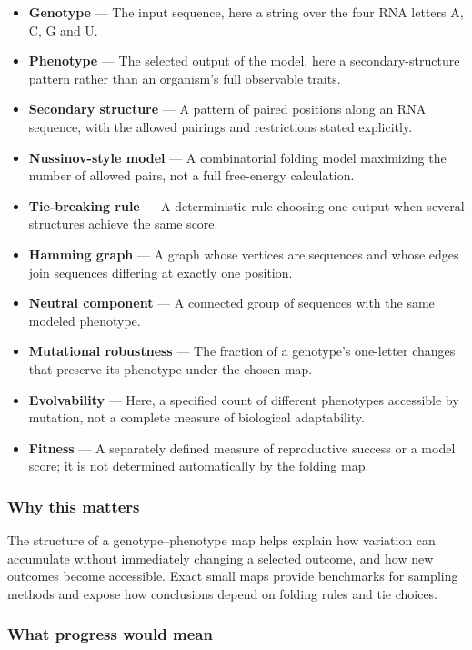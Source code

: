 \documentclass[
  11pt,
]{article}
\begin{document}
\begin{itemize}
\item
  \textbf{Genotype} --- The input sequence, here a string over the four
  RNA letters A, C, G and U.
\item
  \textbf{Phenotype} --- The selected output of the model, here a
  secondary-structure pattern rather than an organism's full observable
  traits.
\item
  \textbf{Secondary structure} --- A pattern of paired positions along
  an RNA sequence, with the allowed pairings and restrictions stated
  explicitly.
\item
  \textbf{Nussinov-style model} --- A combinatorial folding model
  maximizing the number of allowed pairs, not a full free-energy
  calculation.
\item
  \textbf{Tie-breaking rule} --- A deterministic rule choosing one
  output when several structures achieve the same score.
\item
  \textbf{Hamming graph} --- A graph whose vertices are sequences and
  whose edges join sequences differing at exactly one position.
\item
  \textbf{Neutral component} --- A connected group of sequences with the
  same modeled phenotype.
\item
  \textbf{Mutational robustness} --- The fraction of a genotype's
  one-letter changes that preserve its phenotype under the chosen map.
\item
  \textbf{Evolvability} --- Here, a specified count of different
  phenotypes accessible by mutation, not a complete measure of
  biological adaptability.
\item
  \textbf{Fitness} --- A separately defined measure of reproductive
  success or a model score; it is not determined automatically by the
  folding map.
\end{itemize}

\subsubsection{Why this matters}

The structure of a genotype--phenotype map helps explain how variation
can accumulate without immediately changing a selected outcome, and how
new outcomes become accessible. Exact small maps provide benchmarks for
sampling methods and expose how conclusions depend on folding rules and
tie choices.

\subsubsection{What progress would mean}
\end{document}
